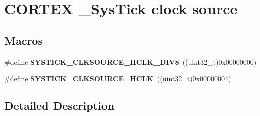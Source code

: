 \hypertarget{group___c_o_r_t_e_x___sys_tick__clock__source}{}\section{C\+O\+R\+T\+EX \+\_\+\+Sys\+Tick clock source}
\label{group___c_o_r_t_e_x___sys_tick__clock__source}
\subsection*{Macros}
\begin{DoxyCompactItemize}
\item 
\#define {\bfseries S\+Y\+S\+T\+I\+C\+K\+\_\+\+C\+L\+K\+S\+O\+U\+R\+C\+E\+\_\+\+H\+C\+L\+K\+\_\+\+D\+I\+V8}~((uint32\+\_\+t)0x00000000)\hypertarget{group___c_o_r_t_e_x___sys_tick__clock__source_ga1fd9b5bada2a8b2425a8523bc0fc7124}{}\label{group___c_o_r_t_e_x___sys_tick__clock__source_ga1fd9b5bada2a8b2425a8523bc0fc7124}

\item 
\#define {\bfseries S\+Y\+S\+T\+I\+C\+K\+\_\+\+C\+L\+K\+S\+O\+U\+R\+C\+E\+\_\+\+H\+C\+LK}~((uint32\+\_\+t)0x00000004)\hypertarget{group___c_o_r_t_e_x___sys_tick__clock__source_ga6f6582df23b6fbc578325e453b9893b7}{}\label{group___c_o_r_t_e_x___sys_tick__clock__source_ga6f6582df23b6fbc578325e453b9893b7}

\end{DoxyCompactItemize}


\subsection{Detailed Description}
